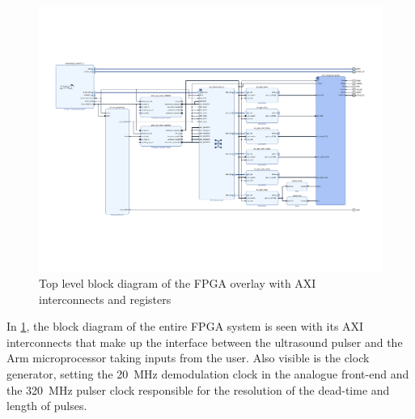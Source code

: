 \begin{figure}[htbp]
	\centering
	\includegraphics[width=\linewidth]{Figures/4_controlsystem_top_bd.pdf}
	\caption{Top level block diagram of the FPGA overlay with AXI interconnects and registers}
	\label{fig:4_controlsystem_top_bd}
\end{figure}
In \cref{fig:4_controlsystem_top_bd}, the block diagram of the entire FPGA system is seen with its AXI interconnects that make up the interface between the ultrasound pulser and the Arm microprocessor taking inputs from the user. Also visible is the clock generator, setting the \qty{20}{\mega\hertz} demodulation clock in the analogue front-end and the \qty{320}{\mega\hertz} pulser clock responsible for the resolution of the dead-time and length of pulses.

